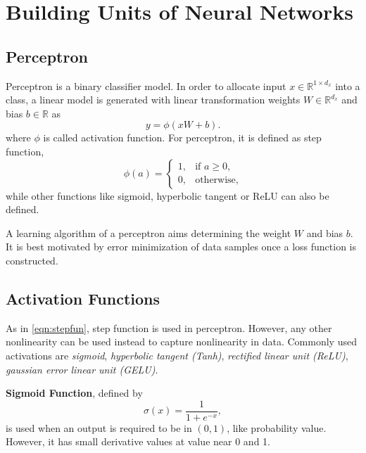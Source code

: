 \section{Building Units of Neural Networks}
\label{sec:building_units}

\subsection{Perceptron}

Perceptron is a binary classifier model. 
In order to allocate input $x \in \mathbb{R}^{1 \times d_x}$ into a class, a linear model is generated with linear transformation weights $W \in \mathbb{R}^{d_x}$ and bias $b \in \mathbb{R}$ as 
\begin{equation}
\label{eqn:perceptron1}
y = \phi(x W + b).
\end{equation}
where $\phi$ is called activation function. 
For perceptron, it is defined as step function, 
\begin{equation}
\label{eqn:stepfun}
\phi(a) = 
\begin{cases}
1,   & \text{if } a\geq 0,\\
0,   & \text{otherwise},
\end{cases}
\end{equation}
while other functions like sigmoid, hyperbolic tangent or ReLU can also be defined. 

A learning algorithm of a perceptron aims determining the weight $W$ and bias $b$. 
It is best motivated by error minimization of data samples once a loss function is constructed. 

\subsection{Activation Functions}

As in \eqref{eqn:stepfun}, step function is used in perceptron. 
However, any other nonlinearity can be used instead to capture nonlinearity in data. 
Commonly used activations are \textit{sigmoid}, \textit{hyperbolic tangent (Tanh)}, \textit{rectified linear unit (ReLU)}, \textit{gaussian error linear unit (GELU)}. 

\textbf{Sigmoid Function}, defined by 
\begin{equation}
\label{eqn:sigmoid_fcn}
\sigma(x) = \frac{1}{1+e^{-x}},
\end{equation}
is used when an output is required to be in $(0,1)$, like probability value. However, it has small derivative values at value near 0 and 1. 


